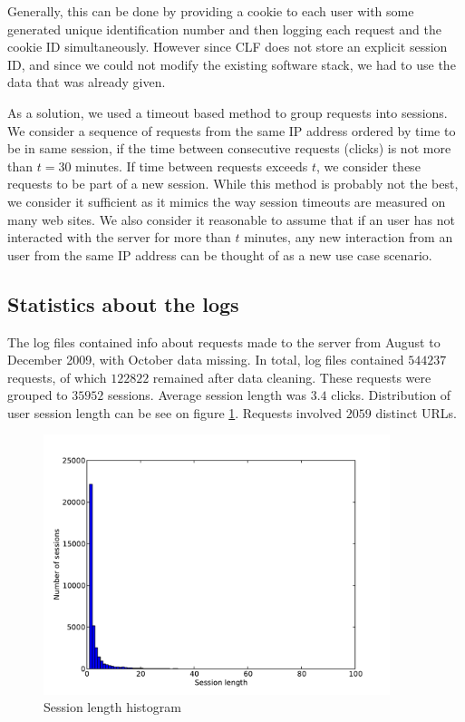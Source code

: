 \documentclass[12pt, english,a4paper]{article}
\begin{document}
Generally, this can be done by providing a cookie to each user with some generated unique identification number and then logging each request and the cookie ID simultaneously. However since CLF does not store an explicit session ID, and since we could not modify the existing software stack, we had to use the data that was already given.  

As a solution, we used a timeout based method to group requests into sessions. We consider a sequence of requests from the same IP address ordered by time to be in same session, if the time between consecutive requests (clicks) is not more
than $t = 30$ minutes. If time between requests exceeds $t$, we consider these requests to be part of a new session. While this method is probably not the best, we consider it sufficient as it mimics the way session timeouts are measured on many web sites. We also consider it reasonable to assume that if an user has not interacted with the server for more than $t$
minutes, any new interaction from an user from the same IP address can be thought of as a new use case scenario.







\subsection{Statistics about the logs} 
The log files contained info about requests made to the server from August to December 2009, with October data missing. In total, log files contained 
$544237$ requests, of which $122822$ remained after data cleaning. These requests were grouped to $35952$ sessions. Average session length was $3.4$ clicks. Distribution of user session length can be see on figure \ref{session_len}. Requests involved $2059$ distinct URLs. 

\begin{figure}[H]
  \centering
      \includegraphics[width=0.9\textwidth]{session_len}
  \caption{Session length histogram}
  \label{session_len}
\end{figure}
\end{document}
